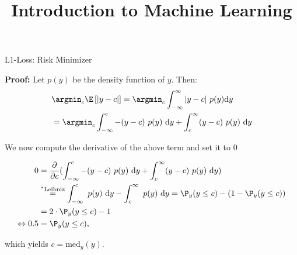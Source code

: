 \documentclass[11pt,compress,t,notes=noshow, xcolor=table]{beamer}
\title{Introduction to Machine Learning}
\begin{document}
    

\begin{frame2}[footnotesize]{L1-Loss: Risk Minimizer}

\textbf{Proof:} Let $p(y)$ be the density function of $y$. Then: 
  \begin{align*}
  & \argmin_c \E\left[|y - c|\right] = \argmin_c \int_{-\infty}^\infty |y - c| ~ p(y) \text{d}y \\
  &= \argmin_c \int_{-\infty}^c -(y - c)~p(y)~\text{d}y + \int_c^\infty (y - c)~p(y)~\text{d}y 
  \end{align*}

We now compute the derivative of the above term and set it to $0$

\begin{align*}
0 &= \frac{\partial}{\partial c} (\int_{-\infty}^c -(y - c)~p(y)~\text{d}y + \int_c^\infty (y - c)~p(y)~\text{d}y) \\
 &\overset{^\ast\text{Leibniz}}{=} \int_{-\infty}^c  ~p(y)~\text{d}y - \int_c^\infty ~p(y)~\text{d}y =   \P_y (y \le c) - (1 - \P_y (y \le c)) \\
&= 2 \cdot \P_y (y \le c) - 1 \\
\Leftrightarrow 0.5 &= \P_y (y \le c),
\end{align*}

which yields $c = \text{med}_y(y)$. 

\end{frame2}
\end{document}
